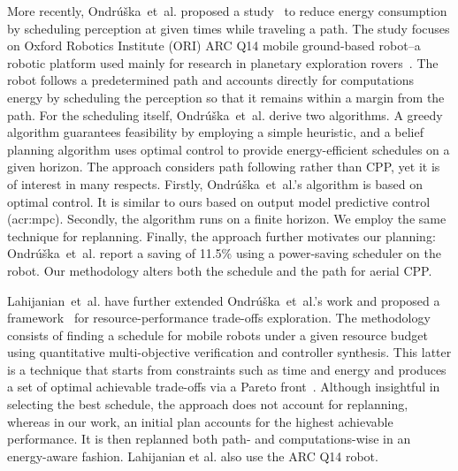 More recently, Ondr\'{u}\v{s}ka~et~al. proposed a study~\citep{ondruska2015scheduled} to reduce energy consumption by scheduling perception at given times while traveling a path. The study focuses on Oxford Robotics Institute (ORI) ARC Q14 mobile ground-based robot--a robotic platform used mainly for research in planetary exploration rovers~\citep{yeomans2017murfi}. The robot follows a predetermined path and accounts directly for computations energy by scheduling the perception so that it remains within a margin from the path. For the scheduling itself, Ondr\'{u}\v{s}ka~et~al. derive two algorithms. A greedy algorithm guarantees feasibility by employing a simple heuristic, and a belief planning algorithm uses optimal control to provide energy-efficient schedules on a given horizon. The approach considers path following rather than CPP, yet it is of interest in many respects. Firstly, Ondr\'{u}\v{s}ka~et~al.'s algorithm is based on optimal control. It is similar to ours based on output model predictive control (\Gls{acr:mpc}). Secondly, the algorithm runs on a finite horizon. We employ the same technique for replanning. Finally, the approach further motivates our planning: Ondr\'{u}\v{s}ka~et~al. report a saving of 11.5\% using a power-saving scheduler on the robot. Our methodology alters both the schedule and the path for aerial CPP.

Lahijanian~et~al. have further extended Ondr\'{u}\v{s}ka~et~al.'s work and proposed a framework~\citep{lahijanian2018resource} for resource-performance trade-offs exploration. 
The methodology consists of finding a schedule for mobile robots under a given resource budget using quantitative multi-objective verification and controller synthesis. This latter is a technique that starts from constraints such as time and energy and produces a set of optimal achievable trade-offs via a Pareto front~\citep{forejt2012pareto}. Although insightful in selecting the best schedule, the approach does not account for replanning, whereas in our work, an initial plan accounts for the highest achievable performance. It is then replanned both path- and computations-wise in an energy-aware fashion. Lahijanian et al. also use the ARC Q14 robot.

